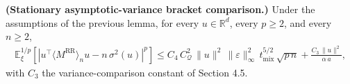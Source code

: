 \begin{corollary}\label{cor:M-RR-bracket-asymp}
  \textbf{(Stationary asymptotic-variance bracket comparison.)}
  Under the assumptions of the previous lemma, for every \(u \in \mathbb{R}^d\), every
  \(p \ge 2\), and every \(n \ge 2\),
\begin{equation}
\begin{aligned}
  \mathbb{E}_\xi^{1 / p} \left[
    | u^\top \langle M^{\text{RR}} \rangle_n u - n \, \sigma^2(u) |^p
  \right]
    \le C_4 \, C_{\mathcal{Q}}^2 \, \lVert  u  \rVert^2 \, \lVert  \varepsilon  \rVert_\infty^2
       \, t_{\text{mix}}^{5 / 2} \, \sqrt{p \, n}
       + \frac{C_3 \, \lVert  u  \rVert^2}{\alpha \, a},
\end{aligned}
\label{eq:M-RR-conc-sigma}
\end{equation}
  with \(C_3\) the variance-comparison constant of Section 4.5.
\end{corollary}

